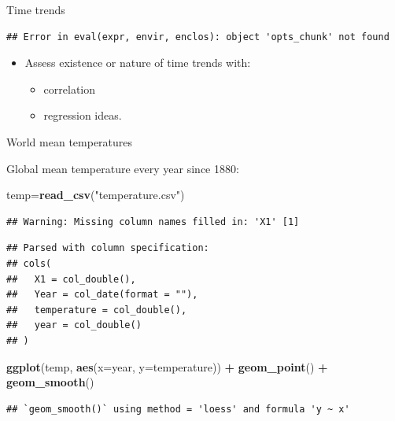 \documentclass[ignorenonframetext,]{beamer}
\newenvironment{Shaded}{\begin{snugshade}}{\end{snugshade}}
\newcommand{\DataTypeTok}[1]{\textcolor[rgb]{0.13,0.29,0.53}{#1}}
\newcommand{\KeywordTok}[1]{\textcolor[rgb]{0.13,0.29,0.53}{\textbf{#1}}}
\newcommand{\NormalTok}[1]{#1}
\newcommand{\OperatorTok}[1]{\textcolor[rgb]{0.81,0.36,0.00}{\textbf{#1}}}
\newcommand{\StringTok}[1]{\textcolor[rgb]{0.31,0.60,0.02}{#1}}
\providecommand{\tightlist}{%
  \setlength{\itemsep}{0pt}\setlength{\parskip}{0pt}}
\begin{document}
\begin{frame}[fragile]{Time trends}
\protect\hypertarget{time-trends}{}

\begin{verbatim}
## Error in eval(expr, envir, enclos): object 'opts_chunk' not found
\end{verbatim}

\begin{itemize}
\tightlist
\item
  Assess existence or nature of time trends with:

  \begin{itemize}
  \tightlist
  \item
    correlation
  \item
    regression ideas.
  \end{itemize}
\end{itemize}

\begin{block}{World mean temperatures}

Global mean temperature every year since 1880:

\begin{Shaded}
\begin{Highlighting}[]
\NormalTok{temp=}\KeywordTok{read_csv}\NormalTok{(}\StringTok{"temperature.csv"}\NormalTok{)}
\end{Highlighting}
\end{Shaded}

\begin{verbatim}
## Warning: Missing column names filled in: 'X1' [1]
\end{verbatim}

\begin{verbatim}
## Parsed with column specification:
## cols(
##   X1 = col_double(),
##   Year = col_date(format = ""),
##   temperature = col_double(),
##   year = col_double()
## )
\end{verbatim}

\begin{Shaded}
\begin{Highlighting}[]
\KeywordTok{ggplot}\NormalTok{(temp, }\KeywordTok{aes}\NormalTok{(}\DataTypeTok{x=}\NormalTok{year, }\DataTypeTok{y=}\NormalTok{temperature)) }\OperatorTok{+}\StringTok{ }\KeywordTok{geom_point}\NormalTok{() }\OperatorTok{+}\StringTok{ }\KeywordTok{geom_smooth}\NormalTok{()}
\end{Highlighting}
\end{Shaded}

\begin{verbatim}
## `geom_smooth()` using method = 'loess' and formula 'y ~ x'
\end{verbatim}


\end{block}
\end{frame}
\end{document}

